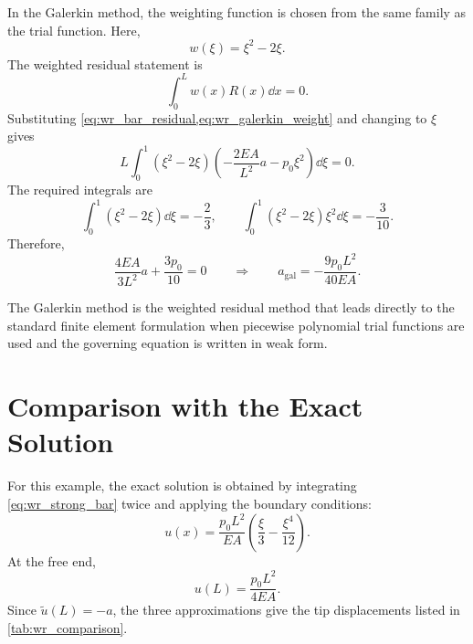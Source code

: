 In the Galerkin method, the weighting function is chosen from the same family
as the trial function. Here,
\begin{equation}
    w(\xi) = \xi^2 - 2\xi .
    \label{eq:wr_galerkin_weight}
\end{equation}
The weighted residual statement is
\begin{equation}
    \int_0^L w(x)R(x)\dd x = 0 .
\end{equation}
Substituting \cref{eq:wr_bar_residual,eq:wr_galerkin_weight} and changing to
$\xi$ gives
\begin{equation}
    L\int_0^1 (\xi^2-2\xi)
    \left(
    -\frac{2EA}{L^2}a - p_0\xi^2
    \right)\dd \xi = 0 .
\end{equation}
The required integrals are
\[
    \int_0^1(\xi^2-2\xi)\dd\xi = -\frac{2}{3},
    \qquad
    \int_0^1(\xi^2-2\xi)\xi^2\dd\xi = -\frac{3}{10}.
\]
Therefore,
\begin{equation}
    \frac{4EA}{3L^2}a + \frac{3p_0}{10} = 0
    \qquad\Rightarrow\qquad
    a_{\mathrm{gal}} = -\frac{9p_0L^2}{40EA}.
    \label{eq:wr_galerkin_a}
\end{equation}

\begin{importantbox}
The Galerkin method is the weighted residual method that leads directly to the
standard finite element formulation when piecewise polynomial trial functions
are used and the governing equation is written in weak form.
\end{importantbox}

\section{Comparison with the Exact Solution}

For this example, the exact solution is obtained by integrating
\cref{eq:wr_strong_bar} twice and applying the boundary conditions:
\begin{equation}
    u(x) = \frac{p_0L^2}{EA}
    \left(\frac{\xi}{3} - \frac{\xi^4}{12}\right).
    \label{eq:wr_exact_solution}
\end{equation}
At the free end,
\begin{equation}
    u(L) = \frac{p_0L^2}{4EA}.
\end{equation}
Since $\tilde{u}(L)=-a$, the three approximations give the tip displacements
listed in \cref{tab:wr_comparison}.

